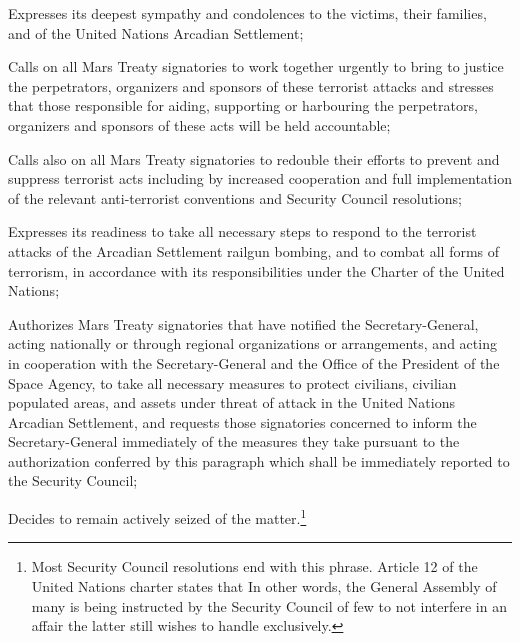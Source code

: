 \item Expresses its deepest sympathy and condolences to the victims, their families, and of the United Nations Arcadian Settlement;

\item Calls on all Mars Treaty signatories to work together urgently to bring to justice the perpetrators, organizers and sponsors of these terrorist attacks and stresses that those responsible for aiding, supporting or harbouring the perpetrators, organizers and sponsors of these acts will be held accountable;

\item Calls also on all Mars Treaty signatories to redouble their efforts to prevent and suppress terrorist acts including by increased cooperation and full implementation of the relevant anti-terrorist conventions and Security Council resolutions;

\item Expresses its readiness to take all necessary steps to respond to the terrorist attacks of the Arcadian Settlement railgun bombing, and to combat all forms of terrorism, in accordance with its responsibilities under the Charter of the United Nations;

\item Authorizes Mars Treaty signatories that have notified the Secretary-General, acting nationally or through regional organizations or arrangements, and acting in cooperation with the Secretary-General and the Office of the President of the Space Agency, to take all necessary measures to protect civilians, civilian populated areas, and assets under threat of attack in the United Nations Arcadian Settlement, and requests those signatories concerned to inform the Secretary-General immediately of the measures they take pursuant to the authorization conferred by this paragraph which shall be immediately reported to the Security Council;

\item Decides to remain actively seized of the matter.\footnote{Most Security Council resolutions end with this phrase. Article 12 of the United Nations charter states that  In other words, the General Assembly of many is being instructed by the Security Council of few to not interfere in an affair the latter still wishes to handle exclusively.}
\stopitemize
\stopTimelineGeneralDocument

